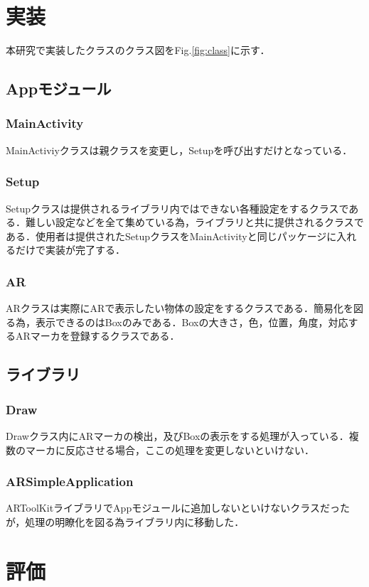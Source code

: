 \documentclass[twocolumn,10pt,a4j]{jsarticle}
\begin{document}
\section{実装}%
本研究で実装したクラスのクラス図をFig.\ref{fig:class}に示す．

\subsection{Appモジュール}	

\subsubsection{MainActivity}
MainActiviyクラスは親クラスを変更し，Setupを呼び出すだけとなっている．

\subsubsection{Setup}
Setupクラスは提供されるライブラリ内ではできない各種設定をするクラスである．難しい設定などを全て集めている為，ライブラリと共に提供されるクラスである．使用者は提供されたSetupクラスをMainActivityと同じパッケージに入れるだけで実装が完了する．

\subsubsection{AR}
ARクラスは実際にARで表示したい物体の設定をするクラスである．簡易化を図る為，表示できるのはBoxのみである．Boxの大きさ，色，位置，角度，対応するARマーカを登録するクラスである．

\subsection{ライブラリ}
\subsubsection{Draw}
Drawクラス内にARマーカの検出，及びBoxの表示をする処理が入っている．複数のマーカに反応させる場合，ここの処理を変更しないといけない．

\subsubsection{ARSimpleApplication}
ARToolKitライブラリでAppモジュールに追加しないといけないクラスだったが，処理の明瞭化を図る為ライブラリ内に移動した．


\section{評価}%
\end{document}
